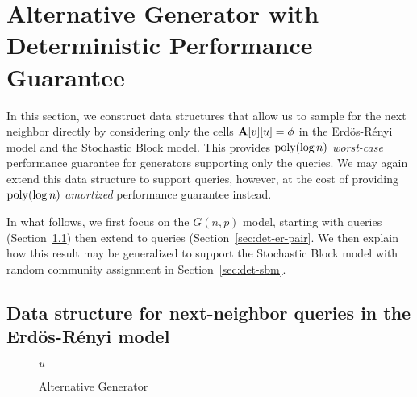 \section{Alternative Generator with Deterministic Performance Guarantee}\label{sec:ER-det}

In this section, we construct data structures that allow us to sample for the next neighbor directly by considering only the cells $\mathbf{A}[v][u]=\phi$ in the Erd\"{o}s-R\'{e}nyi model and the Stochastic Block model. This provides $\mathrm{poly}(\log n)$ \emph{worst-case} performance guarantee for generators supporting only the  queries. We may again extend this data structure to support  queries, however, at the cost of providing $\mathrm{poly}(\log n)$ \emph{amortized} performance guarantee instead.

In what follows, we first focus on the $G(n,p)$ model, starting with  queries (Section~\ref{sec:det-er}) then extend to  queries (Section~\ref{sec:det-er-pair}. We then explain how this result may be generalized to support the Stochastic Block model with random community assignment in Section~\ref{sec:det-sbm}.

\subsection{Data structure for next-neighbor queries in the Erd\"{o}s-R\'{e}nyi model}\label{sec:det-er}

\begin{wrapfigure}[17]{L}{0.5\textwidth}
    \caption{Alternative Generator}
    \label{alg:exact-coin-toss}
    \begin{algorithmic}
            \Else
                \EndIf
            \EndIf
            \State \Return $u$
        \EndProcedure
    \end{algorithmic}
\end{wrapfigure}

